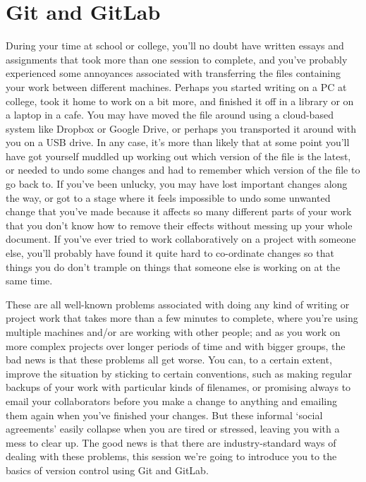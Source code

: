 
\section{Git and GitLab}

During your time at school or college, you'll no doubt have written essays and assignments that took more than one session to complete, and you've probably experienced some annoyances associated with transferring the files containing your work between different machines. Perhaps you started writing on a PC at college, took it home to work on a bit more, and finished it off in a library or on a laptop in a cafe. You may have moved the file around using a cloud-based system like Dropbox or Google Drive, or perhaps you transported it around with you on a USB drive. In any case, it's more than likely that at some point you'll have got yourself muddled up working out which version of the file is the latest, or needed to undo some changes and had to remember which version of the file to go back to. If you've been unlucky, you may have lost important changes along the way, or got to a stage where it feels impossible to undo some unwanted change that you've made because it affects so many different parts of your work that you don't know how to remove their effects without messing up your whole document. If you've ever tried to work collaboratively on a project with someone else, you'll probably have found it quite hard to co-ordinate changes so that things you do don't trample on things that someone else is working on at the same time. 

These are all well-known problems associated with doing any kind of writing or project work that takes more than a few minutes to complete, where you're using multiple machines and/or are working with other people; and as you work on more complex projects over longer periods of time and with bigger groups, the bad news is that these problems all get worse. You can, to a certain extent, improve the situation by sticking to certain conventions, such as making regular backups of your work with particular kinds of filenames, or promising always to email your collaborators before you make a change to anything and emailing them again when you've finished your changes. But these informal `social agreements' easily collapse when you are tired or stressed, leaving you with a mess to clear up. The good news is that there are industry-standard ways of dealing with these problems, this session we're going to introduce you to the basics of version control using Git and GitLab. 

